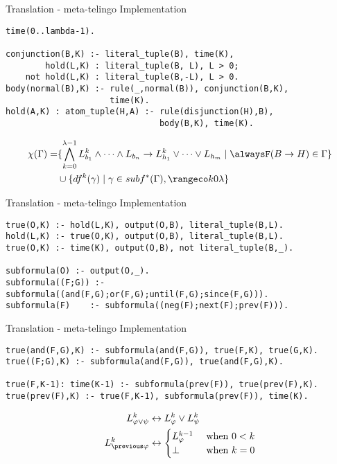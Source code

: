 \documentclass[aspectratio=169,xcolor=svgnames]{beamer}
\theoremstyle{theoremstyle_space}
\begin{document}
\begin{frame}[t,fragile]{Translation - meta-telingo Implementation}
    \begin{lstlisting}[]
time(0..lambda-1).

conjunction(B,K) :- literal_tuple(B), time(K),
        hold(L,K) : literal_tuple(B, L), L > 0;
    not hold(L,K) : literal_tuple(B,-L), L > 0.
body(normal(B),K) :- rule(_,normal(B)), conjunction(B,K), 
                     time(K).
hold(A,K) : atom_tuple(H,A) :- rule(disjunction(H),B), 
                               body(B,K), time(K).
    \end{lstlisting}
\begin{align*}
  \chi(\Gamma)  = &\{ \bigwedge_{k=0}^{\lambda-1} L_{b_1}^k \land \dots \land L_{b_n}
                    \rightarrow L_{h_1}^k \lor \dots \lor L_{h_m} \mid \tempruleshort \in \Gamma \} \\
                  & \cup \{ df^k(\gamma) \mid \gamma \in subf^*(\Gamma), \kinlambda \}
\end{align*}
\end{frame}

\begin{frame}[t,fragile]{Translation - meta-telingo Implementation}
      \begin{lstlisting}[]
true(O,K) :- hold(L,K), output(O,B), literal_tuple(B,L).
hold(L,K) :- true(O,K), output(O,B), literal_tuple(B,L).
true(O,K) :- time(K), output(O,B), not literal_tuple(B,_).

subformula(O) :- output(O,_).
subformula((F;G)) :- subformula((and(F,G);or(F,G);until(F,G);since(F,G))).
subformula(F)	 :- subformula((neg(F);next(F);prev(F))).
    \end{lstlisting}
\end{frame}


\begin{frame}[t,fragile]{Translation - meta-telingo Implementation}
    \begin{lstlisting}[]
true(and(F,G),K) :- subformula(and(F,G)), true(F,K), true(G,K).
true((F;G),K) :- subformula(and(F,G)), true(and(F,G),K).

true(F,K-1): time(K-1) :- subformula(prev(F)), true(prev(F),K).
true(prev(F),K) :- true(F,K-1), subformula(prev(F)), time(K).
    \end{lstlisting}
\begin{align*}
  L^k_{\varphi \lor \psi} &\leftrightarrow L_{\varphi}^k \lor L_{\psi}^k\\
  L^k_{\previous \varphi} &\leftrightarrow \begin{cases} 
    L^{k-1}_{\varphi} &\text{ when } 0 < k\\
    \bot &\text{ when } k = 0
    \end{cases}
\end{align*}
\end{frame}
\end{document}
